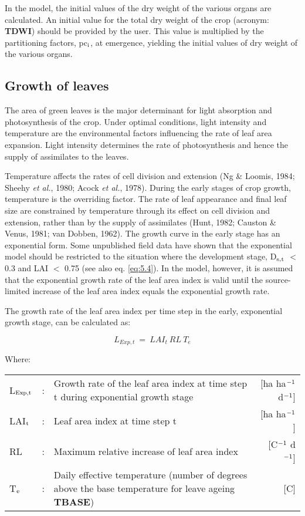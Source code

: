 In the model, the initial values of the dry weight of the
various organs are calculated. An initial value for the total dry weight of the crop
(acronym: {\bf TDWI}) should be provided by the user. This value is multiplied by the
partitioning factors, pc$_{{\rm i}}$, at emergence, yielding the initial values of dry weight of the
various organs.

\subsection{Growth of leaves}
\label{sec:growthofleaves}
The area of green leaves is the major determinant for light absorption and photosynthesis
of the crop. Under optimal conditions, light intensity and temperature are the environmental factors influencing the rate of leaf area expansion. Light intensity determines the
rate of photosynthesis and hence the supply of assimilates to the leaves.

Temperature affects the rates of cell division and extension (Ng \& Loomis, 1984; Sheehy
{\it et al.}, 1980; Acock {\it et al.}, 1978). During the early stages of crop growth, temperature is
the overriding factor. The rate of leaf appearance and final leaf size are constrained by
temperature through its effect on cell division and extension, rather than by the supply of
assimilates (Hunt, 1982; Causton \& Venus, 1981; van Dobben, 1962). The growth curve
in the early stage has an exponential form. Some unpublished field data have shown that
the exponential model should be restricted to the situation where the development stage, 
D$_{{\rm s,t}}$ $<$ 0.3 and LAI $<$ 0.75 (see also eq. \ref{eq:5.4}). In the model, however, it is assumed that
the exponential growth rate of the leaf area index is valid until the source-limited increase
of the leaf area index equals the exponential growth rate.

The growth rate of the leaf area index per time step in the early, exponential growth
stage, can be calculated as:

\begin{equation}
L _{Exp,t} ~=~LAI_{t}~RL~T_{e}
\end{equation}

Where:\\[5pt]
\begin{tabularx}{\textwidth}{llXr}
	L$_{{\rm Exp,t}}$ &:& Growth rate of the leaf area index at time step t
	during exponential growth stage   &    [ha ha$^{{\rm -1}}$ d$^{{\rm -1}}$]\\
	LAI$_{{\rm t}}$ &:& Leaf area index at time step t    &
	[ha ha$^{{\rm -1}}$]\\
	RL &:& Maximum relative increase of leaf area index   &
	[\degrees C$^{{\rm -1}}$ d$^{{\rm -1}}$]\\
	T$_{{\rm e}}$ &:& Daily effective temperature (number of degrees above the base temperature for leave ageing {\bf TBASE})   &
	[\degrees C]\\
\end{tabularx}

